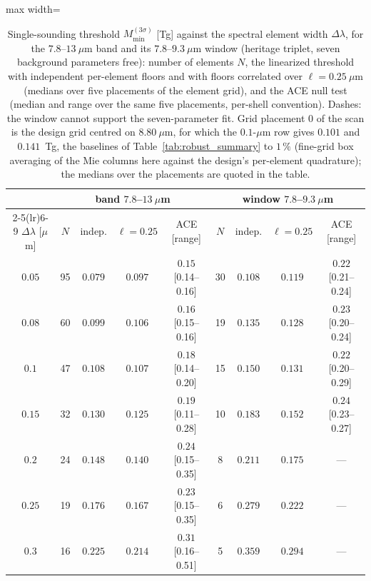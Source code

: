 \begin{table}[t]
\caption{Single-sounding threshold $M_{\min}^{(3\sigma)}$ [Tg] against the spectral element width $\Delta\lambda$, for the $7.8$--$13~\mu$m band and its $7.8$--$9.3~\mu$m window (heritage triplet, seven background parameters free): number of elements $N$, the linearized threshold with independent per-element floors and with floors correlated over $\ell=0.25~\mu$m (medians over five placements of the element grid), and the ACE null test (median and range over the same five placements, per-shell convention). Dashes: the window cannot support the seven-parameter fit. Grid placement 0 of the scan is the design grid centred on $8.80~\mu$m, for which the $0.1$-$\mu$m row gives $0.101$ and $0.141$~Tg, the baselines of Table~\ref{tab:robust_summary} to $1\,\%$ (fine-grid box averaging of the Mie columns here against the design's per-element quadrature); the medians over the placements are quoted in the table.}
\label{tab:element_width}
\centering
\small
\begin{adjustbox}{max width=\textwidth}
\begin{tabular}{c ccc c ccc c}
\toprule
& \multicolumn{4}{c}{band $7.8$--$13~\mu$m} & \multicolumn{4}{c}{window $7.8$--$9.3~\mu$m} \\
\cmidrule(lr){2-5}\cmidrule(lr){6-9}
$\Delta\lambda$ [$\mu$m] & $N$ & indep. & $\ell=0.25$ & ACE [range] & $N$ & indep. & $\ell=0.25$ & ACE [range] \\
\midrule
$0.05$ & 95 & $0.079$ & $0.097$ & $0.15$ [0.14--0.16] & 30 & $0.108$ & $0.119$ & $0.22$ [0.21--0.24] \\
$0.08$ & 60 & $0.099$ & $0.106$ & $0.16$ [0.15--0.16] & 19 & $0.135$ & $0.128$ & $0.23$ [0.20--0.24] \\
$0.1$ & 47 & $0.108$ & $0.107$ & $0.18$ [0.14--0.20] & 15 & $0.150$ & $0.131$ & $0.22$ [0.20--0.29] \\
$0.15$ & 32 & $0.130$ & $0.125$ & $0.19$ [0.11--0.28] & 10 & $0.183$ & $0.152$ & $0.24$ [0.23--0.27] \\
$0.2$ & 24 & $0.148$ & $0.140$ & $0.24$ [0.15--0.35] & 8 & $0.211$ & $0.175$ & --- \\
$0.25$ & 19 & $0.176$ & $0.167$ & $0.23$ [0.15--0.35] & 6 & $0.279$ & $0.222$ & --- \\
$0.3$ & 16 & $0.225$ & $0.214$ & $0.31$ [0.16--0.51] & 5 & $0.359$ & $0.294$ & --- \\
\bottomrule
\end{tabular}
\end{adjustbox}
\end{table}
